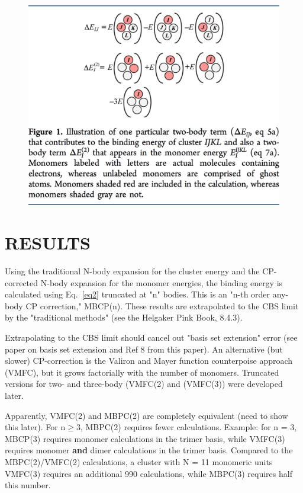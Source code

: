 \documentclass[12pt,a4paper]{article}
\begin{document}
	\begin{figure}[h]
		\includegraphics[scale=0.65]{Figure1.png}
		\centering
	\end{figure}
	\newpage
	\section{RESULTS}
	Using the traditional N-body expansion for the cluster energy and the CP-corrected N-body expansion for the monomer energies, the binding energy is calculated using Eq.~\eqref{eq2} truncated at "n" bodies. This is an "n-th order any-body CP correction," MBCP(n). These results are extrapolated to the CBS limit by the "traditional methods" (see the Helgaker Pink Book, 8.4.3).
	
	Extrapolating to the CBS limit should cancel out "basis set extension" error (see paper on basis set extension and Ref 8 from this paper). An alternative (but slower) CP-correction is the Valiron and Mayer function counterpoise approach (VMFC), but it grows factorially with the number of monomers. Truncated versions for two- and three-body (VMFC(2) and (VMFC(3)) were developed later.
	
	Apparently, VMFC(2) and MBPC(2) are completely equivalent (need to show this later). For n$\geq$3, MBPC(2) requires fewer calculations. Example: for n = 3, MBCP(3) requires monomer calculations in the trimer basis, while VMFC(3) requires monomer \textbf{and} dimer calculations in the trimer basis. Compared to the MBPC(2)/VMFC(2) calculations, a cluster with N = 11 monomeric units VMFC(3) requires an additional 990 calculations, while MBPC(3) requires half this number.  
	
\end{document}
